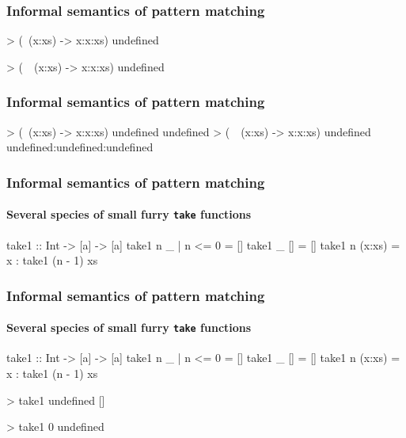 \documentclass{beamer}
\begin{document}
\begin{frame}[fragile]
  \frametitle{Informal semantics of pattern matching}

  \begin{example}
    \begin{code}
> (\  (x:xs) -> x:x:xs) undefined

> (\ ~(x:xs) -> x:x:xs) undefined

    \end{code}
  \end{example}
\end{frame}

\begin{frame}[fragile]
  \frametitle{Informal semantics of pattern matching}

  \begin{example}
    \begin{code}
> (\  (x:xs) -> x:x:xs) undefined
undefined
> (\ ~(x:xs) -> x:x:xs) undefined
undefined:undefined:undefined
    \end{code}
  \end{example}
\end{frame}


\begin{frame}[fragile]
  \frametitle{Informal semantics of pattern matching}
  \framesubtitle{Several species of small furry \texttt{take} functions}

  \begin{code}
take1 :: Int -> [a] -> [a]
take1 n _      | n <= 0 = []
take1 _ []              = []
take1 n (x:xs)          = x : take1 (n - 1) xs
  \end{code}
\end{frame}

\begin{frame}[fragile]
  \frametitle{Informal semantics of pattern matching}
  \framesubtitle{Several species of small furry \texttt{take} functions}

  \begin{code}
take1 :: Int -> [a] -> [a]
take1 n _      | n <= 0 = []
take1 _ []              = []
take1 n (x:xs)          = x : take1 (n - 1) xs
  \end{code}
  \begin{code}
> take1 undefined []

> take1 0 undefined

  \end{code}
\end{frame}
\end{document}
